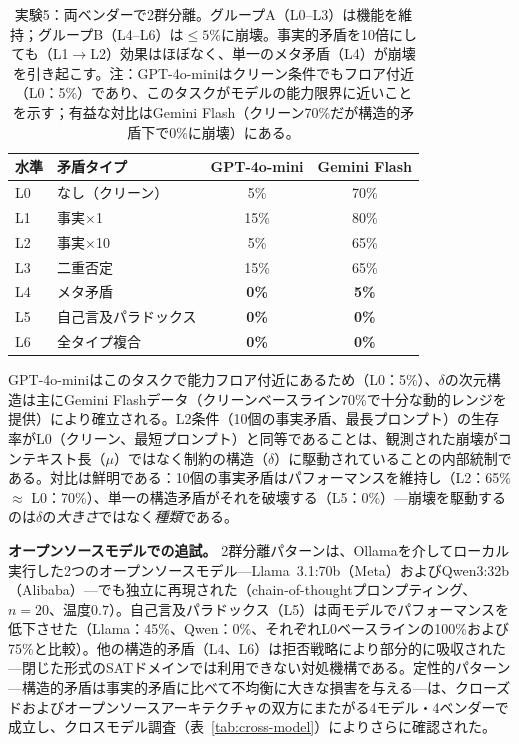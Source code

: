 \documentclass[11pt,a4paper]{article}
\begin{document}
\begin{table}[htbp]
\centering
\small
\begin{tabular}{llcc}
\toprule
\textbf{水準} & \textbf{矛盾タイプ} & \textbf{GPT-4o-mini} & \textbf{Gemini Flash} \\
\midrule
L0 & なし（クリーン） & 5\% & 70\% \\
L1 & 事実$\times$1 & 15\% & 80\% \\
L2 & 事実$\times$10 & 5\% & 65\% \\
L3 & 二重否定 & 15\% & 65\% \\
\midrule
L4 & メタ矛盾 & \textbf{0\%} & \textbf{5\%} \\
L5 & 自己言及パラドックス & \textbf{0\%} & \textbf{0\%} \\
L6 & 全タイプ複合 & \textbf{0\%} & \textbf{0\%} \\
\bottomrule
\end{tabular}
\caption{実験5：両ベンダーで2群分離。グループA（L0--L3）は機能を維持；グループB（L4--L6）は$\leq 5\%$に崩壊。事実的矛盾を10倍にしても（L1$\to$L2）効果はほぼなく、単一のメタ矛盾（L4）が崩壊を引き起こす。注：GPT-4o-miniはクリーン条件でもフロア付近（L0：5\%）であり、このタスクがモデルの能力限界に近いことを示す；有益な対比はGemini Flash（クリーン70\%だが構造的矛盾下で0\%に崩壊）にある。\protect\footnotemark}
\label{tab:exp5}
\end{table}

GPT-4o-miniはこのタスクで能力フロア付近にあるため（L0：5\%）、$\delta$の次元構造は主にGemini Flashデータ（クリーンベースライン70\%で十分な動的レンジを提供）により確立される。L2条件（10個の事実矛盾、最長プロンプト）の生存率がL0（クリーン、最短プロンプト）と同等であることは、観測された崩壊がコンテキスト長（$\mu$）ではなく制約の構造（$\delta$）に駆動されていることの内部統制である。対比は鮮明である：10個の事実矛盾はパフォーマンスを維持し（L2：65\% $\approx$ L0：70\%）、単一の構造矛盾がそれを破壊する（L5：0\%）---崩壊を駆動するのは$\delta$の\emph{大きさ}ではなく\emph{種類}である。

\textbf{オープンソースモデルでの追試。}
2群分離パターンは、Ollamaを介してローカル実行した2つのオープンソースモデル---Llama~3.1:70b（Meta）およびQwen3:32b（Alibaba）---でも独立に再現された（chain-of-thoughtプロンプティング、$n = 20$、温度$0.7$）。自己言及パラドックス（L5）は両モデルでパフォーマンスを低下させた（Llama：45\%、Qwen：0\%、それぞれL0ベースラインの100\%および75\%と比較）。他の構造的矛盾（L4、L6）は拒否戦略により部分的に吸収された---閉じた形式のSATドメインでは利用できない対処機構である。定性的パターン---構造的矛盾は事実的矛盾に比べて不均衡に大きな損害を与える---は、クローズドおよびオープンソースアーキテクチャの双方にまたがる4モデル・4ベンダーで成立し、クロスモデル調査（表~\ref{tab:cross-model}）によりさらに確認された。
\end{document}

